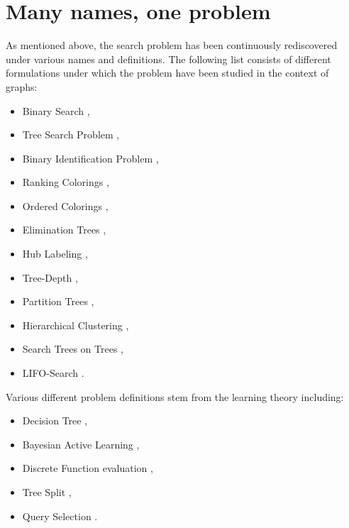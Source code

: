 \section{Many names, one problem}

As mentioned above, the search problem has been continuously rediscovered under various names and definitions. 
The following list consists of different formulations under which the problem have been studied in the context of graphs: 
\begin{itemize}
    \item Binary Search \cite{Knuth1973, OnakParys2006GenOfBSSInTsAndFLikePosets, dereniowski2017ApproxSsForGeneralBSinWTs, Deligkas2019BsInGsRev, Emamjomeh2016DetAndProbBSinGs, dereniowski2022CFApproxAlgForBSInTsWithMonoQTimes, dereniowski2024SInTsMonoQTs, noisyBSSFC, Dereniowski2024OnMG, EfficientNoisyBinarySearch, Dereniowski2023Edge},
    \item Tree Search Problem \cite{Jacobs2010OnTheComplexSearchInTsAvg, Cicalese2014ImprovedApproxAvgTs, Cicalese2016OnTSPwNonUniCost}, 
    \item Binary Identification Problem \cite{Cicalese2012BinIdentPForWTs, Karbasi2013Constrained}, 
    \item Ranking Colorings \cite{Dereniowski2009ERankOfWTs, DereniowskiERAndSInPOSets, DereniowskiEfPQProcByGRank, DereniowskiVxRankOfChGsAndWTs, Lam1998ERankOfGsIsH}, 
    \item Ordered Colorings \cite{KATCHALSKI1995141}, 
    \item Elimination Trees \cite{Pothen1988OptimalEliminationTrees}, 
    \item Hub Labeling \cite{Angelidakis2018ShortestPQ},
    \item Tree-Depth \cite{NESETRIL20061022, BOROWIECKI2023113682},
    \item Partition Trees \cite{OnDasHC, Hgemo2024TightAB},
    \item Hierarchical Clustering \cite{Approximatehierarchicalclusteringviasparsestcutandspreadingmetrics}, 
    \item Search Trees on Trees \cite{SplayTonT, Fast_app_centroid_trees}, 
    \item LIFO-Search \cite{GIANNOPOULOU20122089}. 
\end{itemize}
Various different problem definitions stem from the learning theory including:
\begin{itemize}
    \item Decision Tree \cite{LABER2004209,ATightAnalysisofGreedy, GuptasApproxAlgsForOptDTsAndAdaptTSPPs, Tradingoff},
    \item Bayesian Active Learning \cite{NearoptimalBayesianactivelearning,Analysisofgreedyactivelearningstrategy},
    \item Discrete Function evaluation \cite{Diagnosisdetermination},
    \item Tree Split \cite{OnanOptimalSplitTreeProblem},
    \item Query Selection \cite{QuerySelection}.
\end{itemize}

